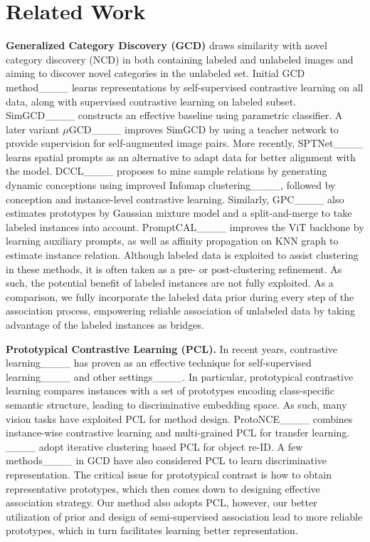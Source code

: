 \section{Related Work}
\textbf{Generalized Category Discovery (GCD)} draws similarity with novel category discovery (NCD) in both containing labeled and unlabeled images and aiming to discover novel categories in the unlabeled set. Initial GCD method____ learns representations by self-supervised contrastive learning on all data, along with supervised contrastive learning on labeled subset. SimGCD____ constructs an effective baseline using parametric classifier. A later variant $\mu$GCD____ improves SimGCD by using a teacher network to provide supervision for self-augmented image pairs. More recently, SPTNet____ learns spatial prompts as an alternative to adapt data for better alignment with the model. DCCL____ proposes to mine sample relations by generating dynamic conceptions using improved Infomap clustering____, followed by conception and instance-level contrastive learning. Similarly, GPC____ also estimates prototypes by Gaussian mixture model and a split-and-merge to take labeled instances into account. PromptCAL____ improves the ViT backbone by learning auxiliary prompts, as well as affinity propagation on KNN graph to estimate instance relation. Although labeled data is exploited to assist clustering in these methods, it is often taken as a pre- or post-clustering refinement. As such, the potential benefit of labeled instances are not fully exploited.  As a comparison, we fully incorporate the labeled data prior during every step of the association process, empowering reliable association of unlabeled data by taking advantage of the labeled instances as bridges. 



\noindent\textbf{Prototypical Contrastive Learning (PCL).}
In recent years, contrastive learning____ has proven as an effective technique for self-supervised learning____ and other settings____. In particular, prototypical contrastive learning compares instances with a set of prototypes encoding class-specific semantic structure, leading to discriminative embedding space. As such, many vision tasks have exploited PCL for method design. ProtoNCE____ combines instance-wise contrastive learning and multi-grained PCL for transfer learning. ____ adopt iterative clustering based PCL for object re-ID. A few methods____ in GCD have also considered PCL to learn discriminative representation. The critical issue for prototypical contrast is how to obtain representative prototypes, which then comes down to designing effective association strategy. Our method also adopts PCL, however, our better utilization of prior and design of semi-supervised association lead to more reliable prototypes, which in turn facilitates learning better representation.


